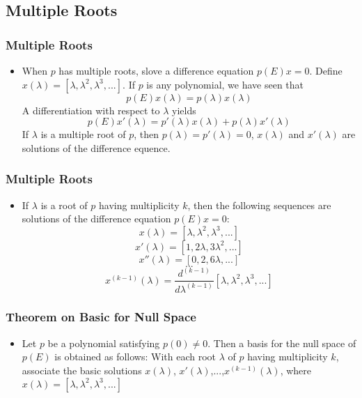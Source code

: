 \documentclass[notheorems,mathserif,table,compress]{beamer}  %
\begin{document}
\subsection{Multiple Roots}
\begin{frame}
\frametitle{Multiple Roots}
\begin{itemize}
\item When $p$ has multiple roots, slove a difference equation $p(E)x=0$. Define $x(\lambda)=[\lambda, \lambda^{2}, \lambda^{3}, ...]$. If $p$ is any polynomial, we have seen that
\begin{displaymath}
p(E)x(\lambda)=p(\lambda)x(\lambda)
\end{displaymath}
A differentiation with respect to $\lambda$ yields
\begin{displaymath}
p(E)x'(\lambda)=p'(\lambda)x(\lambda)+p(\lambda)x'(\lambda)
\end{displaymath}
If $\lambda$ is a multiple root of $p$, then $p(\lambda)=p'(\lambda)=0$, $x(\lambda)$ and $x'(\lambda)$ are solutions of the difference equence.
\end{itemize}
\end{frame}

\begin{frame}
\frametitle{Multiple Roots}
\begin{itemize}
\item If $\lambda$ is a root of $p$ having multiplicity $k$, then the following sequences are solutions of the difference equation $p(E)x=0$:
\begin{displaymath}
x(\lambda)=[\lambda, \lambda^{2}, \lambda^{3},...]
\end{displaymath}
\begin{displaymath}
x'(\lambda)=[1, 2\lambda, 3\lambda^2,...]
\end{displaymath}
\begin{displaymath}
x''(\lambda)=[0, 2, 6\lambda,...]
\end{displaymath}
\begin{displaymath}
    .
    .
    .
\end{displaymath}
\begin{displaymath}
x^{(k-1)}(\lambda)=\frac{d^{(k-1)}}{d\lambda^{(k-1)}}[\lambda, \lambda^{2}, \lambda^{3},...]
\end{displaymath}
   \end{itemize}
\end{frame}

\begin{frame}
\frametitle{Theorem on Basic for Null Space}
\begin{itemize}
\item Let $p$ be a polynomial satisfying $p(0)\neq0$. Then a basis for the null space of $p(E)$ is obtained as follows: With each root $\lambda$ of $p$ having multiplicity $k$, associate the basic solutions $x(\lambda)$, $x'(\lambda)$,...,$x^{(k-1)}(\lambda)$, where $x(\lambda)=[\lambda, \lambda^{2}, \lambda^{3},...]$
\end{itemize}
\end{frame}
\end{document}
